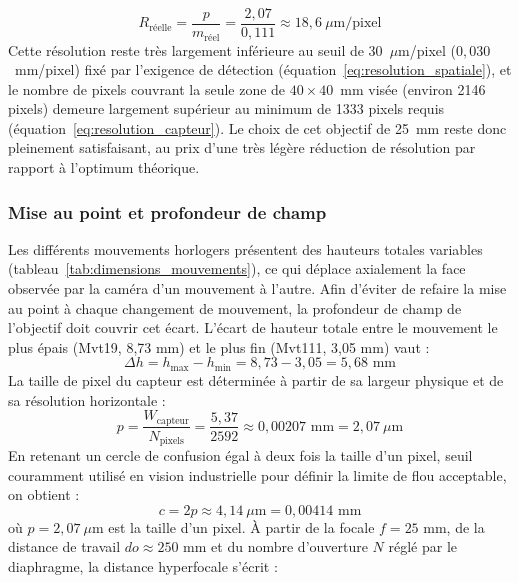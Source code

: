 \begin{equation}
    R_{\text{réelle}} = \frac{p}{m_{\text{réel}}} = \frac{2,07}{0,111} \approx 18,6~\mu\text{m/pixel}
    \label{eq:resolution_reelle}
\end{equation}
\noindent Cette résolution reste très largement inférieure au seuil de 30~$\mu$m/pixel ($0,030$~mm/pixel) fixé par l'exigence de détection (équation~\eqref{eq:resolution_spatiale}), et le nombre de pixels couvrant la seule zone de $40 \times 40$~mm visée (environ 2146 pixels) demeure largement supérieur au minimum de 1333 pixels requis (équation~\eqref{eq:resolution_capteur}). Le choix de cet objectif de 25~mm reste donc pleinement satisfaisant, au prix d'une très légère réduction de résolution par rapport à l'optimum théorique.
\subsubsection{Mise au point et profondeur de champ}
Les différents mouvements horlogers présentent des hauteurs totales variables (tableau~\ref{tab:dimensions_mouvements}), ce qui déplace axialement la face observée par la caméra d'un mouvement à l'autre.
Afin d'éviter de refaire la mise au point à chaque changement de mouvement, la profondeur de champ de l'objectif doit couvrir cet écart.
L'écart de hauteur totale entre le mouvement le plus épais (Mvt19, 8,73 mm) et le plus fin (Mvt111, 3,05 mm) vaut :
\begin{equation}
    \Delta h = h_{\text{max}} - h_{\text{min}} = 8,73 - 3,05 = 5,68 \text{ mm}
    \label{eq:delta_h_mouvements}
\end{equation}
La taille de pixel du capteur est déterminée à partir de sa largeur physique et de sa résolution horizontale :
\begin{equation}
    p = \frac{W_{\text{capteur}}}{N_{\text{pixels}}} = \frac{5,37}{2592} \approx 0,00207 \text{ mm} = 2,07~\mu\text{m}
    \label{eq:taille_pixel}
\end{equation}
En retenant un cercle de confusion égal à deux fois la taille d'un pixel, seuil couramment utilisé en vision industrielle pour définir la limite de flou acceptable, on obtient :
\begin{equation}
    c = 2p \approx 4,14~\mu\text{m} = 0,00414 \text{ mm}
    \label{eq:cercle_confusion}
\end{equation}
\noindent où $p = 2,07~\mu$m est la taille d'un pixel.
À partir de la focale $f = 25$ mm, de la distance de travail $do \approx 250$ mm et du nombre d'ouverture $N$ réglé par le diaphragme, la distance hyperfocale s'écrit :
